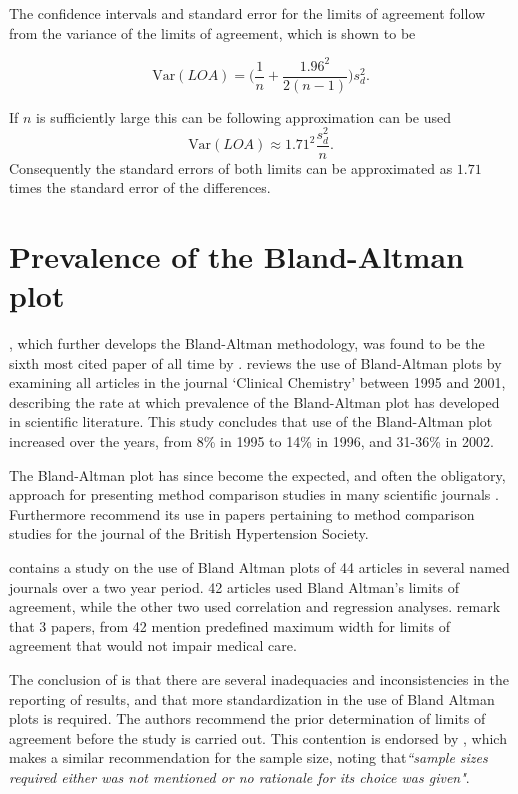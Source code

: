 \documentclass[12pt, a4paper]{report}
\theoremstyle{plain}
\theoremstyle{definition}
\theoremstyle{remark}
\begin{document}
	The confidence intervals and standard error for the limits of agreement follow from the variance of the limits of agreement, which is shown to be
	
	\[
	\mbox{Var}(LOA) = \bigg(\frac{1}{n}+\frac{1.96^{2}}{2(n-1)}\bigg)s_{d}^{2}.
	\]
	
	If $n$ is sufficiently large this can be following approximation can be used
	\[
	\mbox{Var}(LOA) \approx 1.71^{2}\frac{s_{d}^{2}}{n}.
	\]
	Consequently the standard errors of both limits can be approximated as $1.71$ times the standard error of the differences.


\section{Prevalence of the Bland-Altman plot}

\citet*{BA86}, which further develops the Bland-Altman methodology,
was found to be the sixth most cited paper of all time by \citet{BAcite}. \cite{Dewitte} reviews the use of Bland-Altman plots by examining all articles in the journal `Clinical Chemistry' between 1995 and 2001, describing the rate at which
prevalence of the Bland-Altman plot has developed in scientific
literature. This study concludes that use of the Bland-Altman plot increased over the years, from 8\% in 1995 to
14\% in 1996, and 31-36\% in 2002.

The Bland-Altman plot has since become the expected, and often the obligatory, approach for presenting method comparison
studies in many scientific journals \citep{hollis}. Furthermore \citet{BritHypSoc} recommend its use in papers pertaining to
method comparison studies for the journal of the British Hypertension Society.


\citet{mantha} contains a study on the use of Bland Altman plots of 44 articles in several named journals over a two year period. 42 articles used Bland Altman's limits of agreement, while the other two used correlation and regression analyses. \citet{mantha} remark that 3 papers, from 42 mention predefined maximum width for limits of agreement that would not impair medical care.

The conclusion of \citet{mantha} is that there are several inadequacies and inconsistencies in the reporting of results, and
that more standardization in the use of Bland Altman plots is required. The authors recommend the prior determination of limits of agreement before the study is carried out. This contention is endorsed by \citet{lin}, which makes a similar recommendation for the sample size, noting that\emph{``sample sizes required either was 	not mentioned or no rationale for its choice was given"}.
\end{document}
